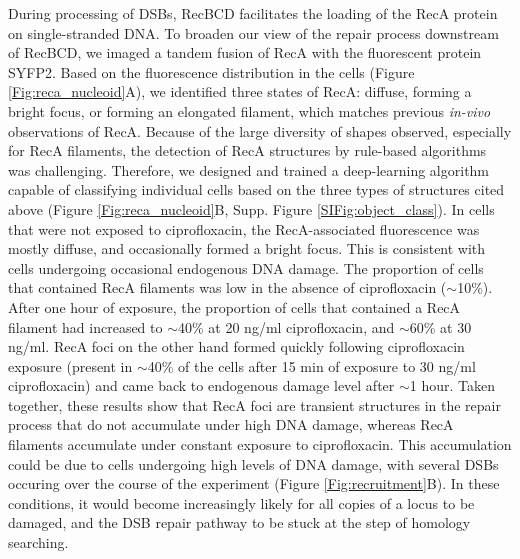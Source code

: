 During processing of DSBs, RecBCD facilitates the loading of the RecA protein on single-stranded DNA. To broaden our view of the repair process downstream of RecBCD, we imaged a tandem fusion of RecA with the fluorescent protein SYFP2.\cite{Wiktor2021} Based on the fluorescence distribution in the cells (Figure \ref{Fig:reca_nucleoid}A), we identified three states of RecA: diffuse, forming a bright focus, or forming an elongated filament, which matches previous \emph{in-vivo} observations of RecA\cite{Wiktor2021}. Because of the large diversity of shapes observed, especially for RecA filaments, the detection of RecA structures by rule-based algorithms was challenging. Therefore, we designed and trained a deep-learning algorithm capable of classifying individual cells based on the three types of structures cited above (Figure \ref{Fig:reca_nucleoid}B, Supp. Figure \ref{SIFig:object_class}). In cells that were not exposed to ciprofloxacin, the RecA-associated fluorescence was mostly diffuse, and occasionally formed a bright focus. This is consistent with cells undergoing occasional endogenous DNA damage. The proportion of cells that contained RecA filaments was low in the absence of ciprofloxacin ($\sim$10\%). After one hour of exposure, the proportion of cells that contained a RecA filament had increased to $\sim$40\% at 20 ng/ml ciprofloxacin, and $\sim$60\% at 30 ng/ml. RecA foci on the other hand formed quickly following ciprofloxacin exposure (present in $\sim$40\% of the cells after 15 min of exposure to 30 ng/ml ciprofloxacin) and came back to endogenous damage level after $\sim$1 hour. Taken together, these results show that RecA foci are transient structures in the repair process that do not accumulate under high DNA damage, whereas RecA filaments accumulate under constant exposure to ciprofloxacin. This accumulation could be due to cells undergoing high levels of DNA damage, with several DSBs occuring over the course of the experiment (Figure \ref{Fig:recruitment}B). In these conditions, it would become increasingly likely for all copies of a locus to be damaged, and the DSB repair pathway to be stuck at the step of homology searching.

